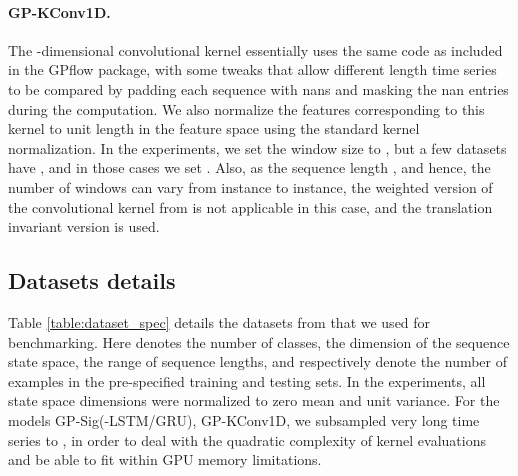 \documentclass{article}
\begin{document}
\paragraph{GP-KConv1D.} The -dimensional convolutional kernel essentially uses the same code as \cite{Wilk2017ConvGP} included in the GPflow package, with some tweaks that allow different length time series to be compared by padding each sequence with nans and masking the nan entries during the computation. We also normalize the features corresponding to this kernel to unit length in the feature space using the standard kernel normalization. In the experiments, we set the window size to , but a few datasets have , and in those cases we set . Also, as the sequence length , and hence, the number of windows can vary from instance to instance, the weighted version of the convolutional kernel from \cite{Wilk2017ConvGP} is not applicable in this case, and the translation invariant version is used.


\subsection{Datasets details} \label{app:datasets}

Table \ref{table:dataset_spec} details the datasets from \cite{baydogan2015multivarate} that we used for benchmarking. Here  denotes the number of classes,  the dimension of the sequence state space,  the range of sequence lengths,  and  respectively denote the number of examples in the pre-specified training and testing sets. In the experiments, all state space dimensions were normalized to zero mean and unit variance. For the models GP-Sig(-LSTM/GRU), GP-KConv1D, we subsampled very long time series to , in order to deal with the quadratic complexity of kernel evaluations and be able to fit within GPU memory limitations.
\end{document}
